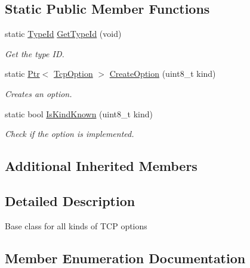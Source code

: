 \subsection*{Static Public Member Functions}
\begin{DoxyCompactItemize}
\item 
static \hyperlink{classns3_1_1TypeId}{Type\+Id} \hyperlink{classns3_1_1TcpOption_a8a8c88f6ff5cd5b4e3b9de876f1cccb3}{Get\+Type\+Id} (void)
\begin{DoxyCompactList}\small\item\em Get the type ID. \end{DoxyCompactList}\item 
static \hyperlink{classns3_1_1Ptr}{Ptr}$<$ \hyperlink{classns3_1_1TcpOption}{Tcp\+Option} $>$ \hyperlink{classns3_1_1TcpOption_a342764c94f23eae9c093534312f7a5d4}{Create\+Option} (uint8\+\_\+t kind)
\begin{DoxyCompactList}\small\item\em Creates an option. \end{DoxyCompactList}\item 
static bool \hyperlink{classns3_1_1TcpOption_aa4227e120fb09b89b6f088b19529344c}{Is\+Kind\+Known} (uint8\+\_\+t kind)
\begin{DoxyCompactList}\small\item\em Check if the option is implemented. \end{DoxyCompactList}\end{DoxyCompactItemize}
\subsection*{Additional Inherited Members}


\subsection{Detailed Description}
Base class for all kinds of T\+CP options 

\subsection{Member Enumeration Documentation}

